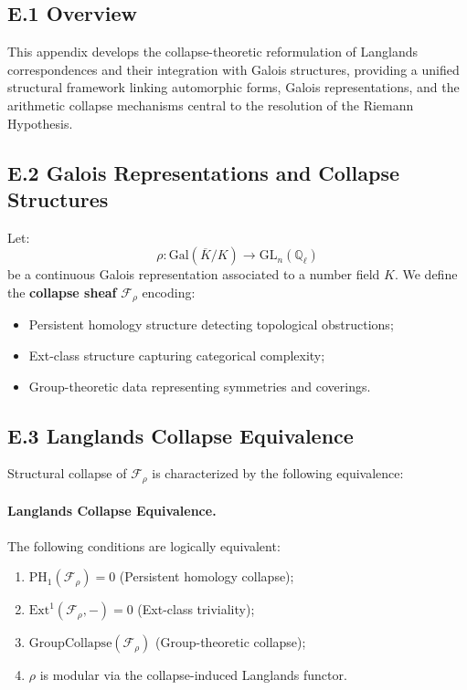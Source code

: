 \documentclass[11pt]{article}
\begin{document}
\subsection*{E.1 Overview}

This appendix develops the collapse-theoretic reformulation of Langlands correspondences and their integration with Galois structures, providing a unified structural framework linking automorphic forms, Galois representations, and the arithmetic collapse mechanisms central to the resolution of the Riemann Hypothesis.

\subsection*{E.2 Galois Representations and Collapse Structures}

Let:
\[
\rho : \mathrm{Gal}(\overline{K}/K) \longrightarrow \mathrm{GL}_n(\mathbb{Q}_\ell)
\]
be a continuous Galois representation associated to a number field $K$. We define the \textbf{collapse sheaf} $\mathcal{F}_\rho$ encoding:

\begin{itemize}
    \item Persistent homology structure detecting topological obstructions;
    \item Ext-class structure capturing categorical complexity;
    \item Group-theoretic data representing symmetries and coverings.
\end{itemize}

\subsection*{E.3 Langlands Collapse Equivalence}

Structural collapse of $\mathcal{F}_\rho$ is characterized by the following equivalence:

\paragraph{Langlands Collapse Equivalence.}  
The following conditions are logically equivalent:
\begin{enumerate}
    \item $\mathrm{PH}_1(\mathcal{F}_\rho) = 0$ \quad (Persistent homology collapse);
    \item $\mathrm{Ext}^1(\mathcal{F}_\rho, -) = 0$ \quad (Ext-class triviality);
    \item $\mathrm{GroupCollapse}(\mathcal{F}_\rho)$ \quad (Group-theoretic collapse);
    \item $\rho$ is modular via the collapse-induced Langlands functor.
\end{enumerate}
\end{document}
